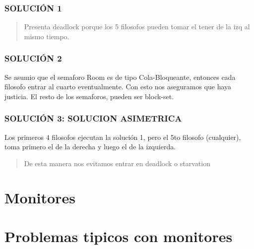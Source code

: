 \documentclass{article}
\begin{document}
\subsubsection{SOLUCIÓN 1}



\begin{quote}
    Presenta deadlock porque los 5 filosofos pueden tomar el tener de la izq al mismo tiempo.
\end{quote}

\newpage
\subsubsection{SOLUCIÓN 2}



Se asumio que el semaforo Room es de tipo Cola-Bloqueante, entonces cada filosofo entrar al cuarto eventualmente. Con esto nos aseguramos que haya justicia.
El resto de los semaforos, pueden ser block-set.

\subsubsection{SOLUCIÓN 3: SOLUCION ASIMETRICA}

Los primeros 4 filosofos ejecutan la solución 1, pero el 5to filosofo (cualquier), toma primero el de la derecha y luego el de la izquierda.



\begin{quote}
    De esta manera nos evitamos entrar en deadlock o starvation
\end{quote}



\section{Monitores}

\section{Problemas tipicos con monitores}
\end{document}
